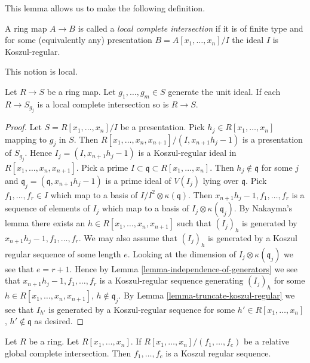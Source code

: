 \noindent
This lemma allows us to make the following definition.

\begin{definition}
\label{definition-local-complete-intersection}
A ring map $A \to B$ is called a {\it local complete intersection}
if it is of finite type and for some (equivalently any) presentation
$B = A[x_1, \ldots, x_n]/I$ the ideal $I$ is Koszul-regular.
\end{definition}

\noindent
This notion is local.

\begin{lemma}
\label{lemma-lci-local}
Let $R \to S$ be a ring map. Let $g_1, \ldots, g_m \in S$
generate the unit ideal. If each $R \to S_{g_j}$ is a local
complete intersection so is $R \to S$.
\end{lemma}

\begin{proof}
Let $S = R[x_1, \ldots, x_n]/I$ be a presentation. Pick
$h_j \in R[x_1, \ldots, x_n]$ mapping to $g_j$ in $S$.
Then $R[x_1, \ldots, x_n, x_{n + 1}]/(I, x_{n + 1}h_j - 1)$
is a presentation of $S_{g_j}$. Hence
$I_j = (I, x_{n + 1}h_j - 1)$ is a Koszul-regular ideal in
$R[x_1, \ldots, x_n, x_{n + 1}]$. Pick a prime
$I \subset \mathfrak q \subset R[x_1, \ldots, x_n]$.
Then $h_j \not \in \mathfrak q$ for some $j$ and
$\mathfrak q_j = (\mathfrak q, x_{n + 1}h_j - 1)$ is a prime
ideal of $V(I_j)$ lying over $\mathfrak q$.
Pick $f_1, \ldots, f_r \in I$ which map to a basis of
$I/I^2 \otimes \kappa(\mathfrak q)$. Then
$x_{n + 1}h_j - 1, f_1, \ldots, f_r$ is a sequence of elements of $I_j$
which map to a basis of $I_j \otimes \kappa(\mathfrak q_j)$.
By Nakayma's lemma there exists an $h \in R[x_1, \ldots, x_n, x_{n + 1}]$
such that $(I_j)_h$ is generated by $x_{n + 1}h_j - 1, f_1, \ldots, f_r$.
We may also assume that $(I_j)_h$ is generated by a Koszul regular
sequence of some length $e$. Looking at the dimension of
$I_j \otimes \kappa(\mathfrak q_j)$ we see that $e = r + 1$.
Hence by
Lemma \ref{lemma-independence-of-generators}
we see that $x_{n + 1}h_j - 1, f_1, \ldots, f_r$ is a
Koszul-regular sequence generating $(I_j)_h$ for some
$h \in R[x_1, \ldots, x_n, x_{n + 1}]$, $h \not \in \mathfrak q_j$. By
Lemma \ref{lemma-truncate-koszul-regular}
we see that $I_{h'}$ is generated by a Koszul-regular sequence for some
$h' \in R[x_1, \ldots, x_n]$, $h' \not \in \mathfrak q$ as desired.
\end{proof}

\begin{lemma}
\label{lemma-relative-global-complete-intersection-koszul}
Let $R$ be a ring. Let
$R[x_1, \ldots, x_n]$. If $R[x_1, \ldots, x_n]/(f_1, \ldots, f_c)$
be a relative global complete intersection. Then $f_1, \ldots, f_c$
is a Koszul regular sequence.
\end{lemma}

